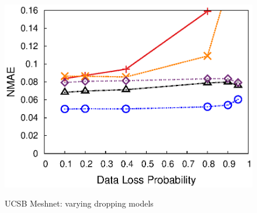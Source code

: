 \begin{figure}[h!]
{{    \includegraphics[width=\figurewidthQ]{fig_lens3/pred.ElemRandLoss.srmf_based_pred.tm_multi_loc_rssi.txt.500.895.1.500.r16.period1.org.2d.elem.ind.elem0.5.burst1.na0.05.anom1.noise0.thresh-1.eps}
  }
  \hspace{-0.1in}
  }
  \vspace{-0.15in}
  \caption{UCSB Meshnet: varying dropping models}
  \label{fig:geant-drop-mode-interpolation}
\end{figure}

